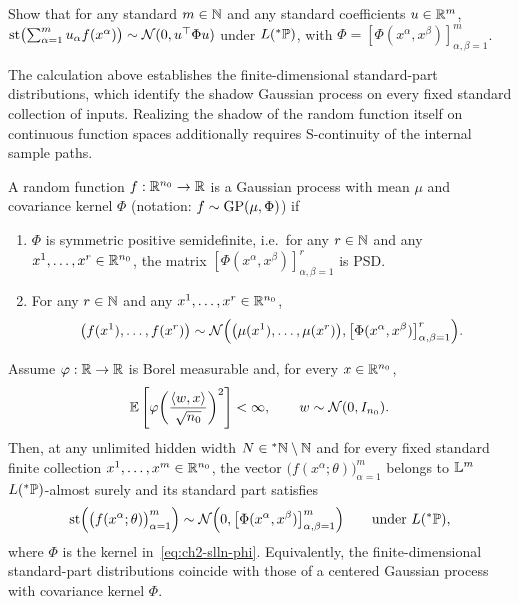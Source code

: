 \begin{exercise}\label{ex:ch2-linear-comb}
Show that for any standard $m \in \mathbb{N}$ and any standard coefficients $u \in \mathbb{R}^m$, $\operatorname{st}\bigl(\sum_{\alpha=1}^{m} u_\alpha f(x^\alpha)\bigr) \sim \mathcal{N}(0, u^\top \Phi u)$ under $L({}^*\mathbb{P})$, with $\Phi = [\Phi(x^\alpha, x^\beta)]_{\alpha,\beta=1}^{m}$.
\end{exercise}

The calculation above establishes the finite-dimensional standard-part distributions, which identify the shadow Gaussian process on every fixed standard collection of inputs. Realizing the shadow of the random function itself on continuous function spaces additionally requires S-continuity of the internal sample paths.

\begin{definition}\label{def:ch2-gp}
A random function $f : \mathbb{R}^{n_0} \to \mathbb{R}$ is a Gaussian process with mean $\mu$ and covariance kernel $\Phi$ (notation: $f \sim \operatorname{GP}(\mu, \Phi)$) if
\begin{enumerate}[label=(\roman*)]
\item $\Phi$ is symmetric positive semidefinite, i.e.\ for any $r \in \mathbb{N}$ and any $x^1, \dots, x^r \in \mathbb{R}^{n_0}$, the matrix $[\Phi(x^\alpha, x^\beta)]_{\alpha,\beta=1}^{r}$ is PSD.
\item For any $r \in \mathbb{N}$ and any $x^1, \dots, x^r \in \mathbb{R}^{n_0}$,
\begin{equation}\label{eq:ch2-gp-fdd}
\bigl(f(x^1), \dots, f(x^r)\bigr) \sim \mathcal{N}\Bigl(\bigl(\mu(x^1), \dots, \mu(x^r)\bigr), \bigl[\Phi(x^\alpha, x^\beta)\bigr]_{\alpha,\beta=1}^{r}\Bigr).
\end{equation}
\end{enumerate}
\end{definition}

\begin{theorem}\label{thm:ch2-nngp-fdd}
Assume $\varphi : \mathbb{R} \to \mathbb{R}$ is Borel measurable and, for every $x \in \mathbb{R}^{n_0}$,
\begin{equation}\label{eq:ch2-phi-l2}
\mathbb{E}\left[ \varphi\!\left(\frac{\left\langle w, x \right\rangle}{\sqrt{n_0}}\right)^2 \right] < \infty, \qquad w \sim \mathcal{N}(0, I_{n_0}).
\end{equation}
Then, at any unlimited hidden width $N \in {}^*\mathbb{N} \setminus \mathbb{N}$ and for every fixed standard finite collection $x^1, \dots, x^m \in \mathbb{R}^{n_0}$, the vector $\bigl(f(x^\alpha; \theta)\bigr)_{\alpha=1}^{m}$ belongs to $\mathbb{L}^m$ $L({}^*\mathbb{P})$-almost surely and its standard part satisfies
\begin{equation}\label{eq:ch2-nngp-thm-law}
\operatorname{st}\Bigl(\bigl(f(x^\alpha; \theta)\bigr)_{\alpha=1}^{m}\Bigr) \sim \mathcal{N}\Bigl(0, \bigl[\Phi(x^\alpha, x^\beta)\bigr]_{\alpha,\beta=1}^{m}\Bigr) \qquad \text{under } L({}^*\mathbb{P}),
\end{equation}
where $\Phi$ is the kernel in~\eqref{eq:ch2-slln-phi}. Equivalently, the finite-dimensional standard-part distributions coincide with those of a centered Gaussian process with covariance kernel $\Phi$.
\end{theorem}

